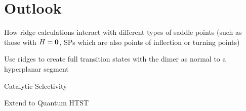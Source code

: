 \section{Outlook}
\label{sec:summary-outlook}

\bit
\item How ridge calculations interact with different types of saddle points (such as those with $H = {\mathrm{\mathbf{\bm{0}}}}$, SPs which are also points of inflection or turning points)
\item Use ridges to create full transition states with the dimer as normal to a hyperplanar segment
\item Catalytic Selectivity
\item Extend to Quantum HTST
\eit

\placeholder
